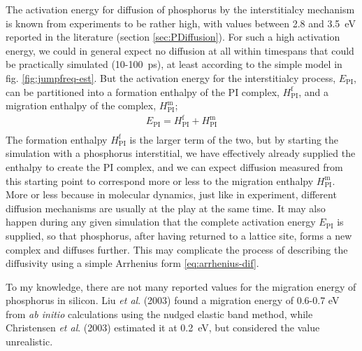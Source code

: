 \documentclass[11pt,bibliography=totoc,index=totoc]{scrbook}   %
\begin{document}
The activation energy for diffusion of phosphorus by the interstitialcy mechanism is known from experiments to be rather high, with values between 2.8 and 3.5~eV reported in the literature (section \ref{sec:PDiffusion}). 
For such a high activation energy, we could in general expect no diffusion at all within timespans that could be practically simulated (10-100~ps), at least according to the simple model in fig. \ref{fig:jumpfreq-est}.
But the activation energy for the interstitialcy process, $E_{\text{PI}}$,
can be partitioned into a formation enthalpy of the PI complex, $H_{\text{PI}}^{\text{f}}$, and a migration enthalpy of 
the complex, $H_{\text{PI}}^{\text{m}}$;\cite[323]{Fahey:1989}
\begin{align}
    E_{\text{PI}} = H_{\text{PI}}^{\text{f}} + H_{\text{PI}}^{\text{m}} \\
\end{align}
The formation enthalpy $H_{\text{PI}}^{\text{f}}$ is the larger term of the two, but
by starting the simulation with a phosphorus interstitial, we have effectively already 
supplied the enthalpy to create the PI complex, 
and we can expect diffusion measured from this starting point to correspond more or less to the migration enthalpy $H_{\text{PI}}^{\text{m}}$.
More or less because in molecular dynamics, just like in experiment, different diffusion mechanisms are usually at the play at the same time.
It may also happen during any given simulation that the complete activation energy $E_{\text{PI}}$ is supplied, so that phosphorus, after having returned to a lattice site, forms a new complex and diffuses further.
This may complicate the process of describing the diffusivity using a simple Arrhenius form \eqref{eq:arrhenius-dif}.

To my knowledge, there are not many reported values for the migration energy of phosphorus in silicon.
Liu \textit{et al}. (2003) found a migration energy of 0.6-0.7 eV from \textit{ab initio} calculations using the nudged elastic band method,\cite{Liu:2003}
while Christensen \textit{et al}. (2003) estimated it at 0.2~eV, but considered the value unrealistic.\cite{Christensen:2003}

\end{document}
